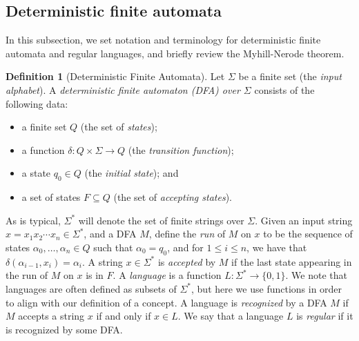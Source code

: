 \documentclass[11pt,a4paper]{amsart}
\theoremstyle{definition}
\newtheorem{definition}{Definition}
\DeclareMathOperator{\Ldim}{Ldim}
\DeclareMathOperator{\Cdim}{Cdim}
\DeclareMathOperator{\SCdim}{SCdim}
\begin{document}

\subsection{Deterministic finite automata}

In this subsection, we set notation and terminology for deterministic finite automata and regular languages, and briefly review the Myhill-Nerode theorem.

\begin{definition}[Deterministic Finite Automata]
    Let $\Sigma$ be a finite set (the \emph{input alphabet}). 
    A \emph{deterministic finite automaton (DFA) over $\Sigma$} consists of the following data:
    \begin{itemize}
        \item a finite set $Q$ (the set of \emph{states}); 
        \item a function $\delta : Q \times \Sigma \to Q$ (the \emph{transition function});
        \item a state $q_0 \in Q$  (the \emph{initial state}); and
        \item a set of states $F \subseteq Q$  (the set of \emph{accepting states}).
    \end{itemize}
\end{definition}

As is typical, $\Sigma^*$ will denote the set of finite strings over $\Sigma$.
Given an input string $x = x_1 x_2 \cdots x_n \in \Sigma^*$, and a DFA $M$, define the \emph{run} of $M$ on $x$ to be the sequence of states $\alpha_0, \ldots, \alpha_n \in Q$ such that $\alpha_0 = q_0$, and for $1 \leq i \leq n$, we have that $\delta(\alpha_{i-1}, x_i) = \alpha_i$. 
A string $x \in \Sigma^*$ is \emph{accepted} by $M$ if the last state appearing in the run of $M$ on $x$ is in $F$.
A \emph{language} is a function $L : \Sigma^* \to \{0,1\}$.
We note that languages are often defined as subsets of $\Sigma^*$, but here we use functions in order to align with our definition of a concept.
A language is \emph{recognized} by a DFA $M$ if $M$ accepts a string $x$ if and only if $x \in L$.
We say that a language $L$ is \emph{regular} if it is recognized by some DFA.
\end{document}
